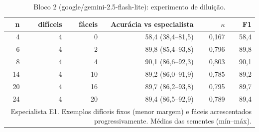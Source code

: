 \begin{table}[htbp]
\centering
\small
\caption{Bloco 2 (google/gemini-2.5-flash-lite): experimento de diluição.}
\label{tab:bloco2_E1_diluicao_flashlite}
\begin{tabular}{rrrrrr}
\toprule
n & difíceis & fáceis & Acurácia vs especialista & $\kappa$ & F1 \\
\midrule
4 & 4 & 0 & 58,4 (38,4–81,5) & 0,167 & 58,4 \\
6 & 4 & 2 & 89,8 (85,4–93,8) & 0,796 & 89,8 \\
8 & 4 & 4 & 90,1 (86,6–92,3) & 0,803 & 90,1 \\
14 & 4 & 10 & 89,2 (86,0–91,9) & 0,785 & 89,2 \\
20 & 4 & 16 & 89,7 (86,2–93,8) & 0,795 & 89,7 \\
24 & 4 & 20 & 89,4 (86,5–92,9) & 0,789 & 89,4 \\
\bottomrule
\multicolumn{6}{p{0.95\linewidth}}{\footnotesize Especialista E1. Exemplos difíceis fixos (menor margem) e fáceis acrescentados progressivamente. Médias das sementes (mín–máx).} \\
\end{tabular}
\end{table}
